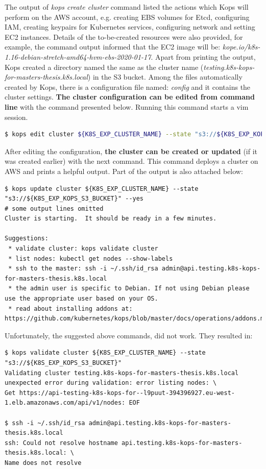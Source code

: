 The output of \textit{kops create cluster} command listed the actions which Kops will perform on the AWS account, e.g. creating EBS volumes for Etcd, configuring IAM, creating keypairs for Kubernetes services, configuring network and setting EC2 instances. Details of the to-be-created resources were also provided, for example, the command output informed that the EC2 image will be: \textit{kope.io/k8s-1.16-debian-stretch-amd64-hvm-ebs-2020-01-17}. Apart from printing the output, Kops created a directory named the same as the cluster name (\textit{testing.k8s-kops-for-masters-thesis.k8s.local}) in the S3 bucket. Among the files automatically created by Kops, there is a configuration file named: \textit{config} and it contains the cluster settings. \textbf{The cluster configuration can be edited from command line} with the command presented below. Running this command starts a vim session.
\begin{lstlisting}[basicstyle=\tiny,caption={Command used to edit a Kubernetes cluster managed by Kops},captionpos=b,language=Bash,xleftmargin=1cm]
$ kops edit cluster ${K8S_EXP_CLUSTER_NAME} --state "s3://${K8S_EXP_KOPS_S3_BUCKET}"
\end{lstlisting}
After editing the configuration, \textbf{the cluster can be created or updated} (if it was created earlier) with the next command. This command deploys a cluster on AWS and prints a helpful output. Part of the output is also attached below:
\begin{mdframed}[linecolor=white]
\begin{lstlisting}[basicstyle=\tiny,caption={Command used to deploy a Kubernetes cluster with Kops}]
$ kops update cluster ${K8S_EXP_CLUSTER_NAME} --state "s3://${K8S_EXP_KOPS_S3_BUCKET}" --yes
# some output lines omitted
Cluster is starting.  It should be ready in a few minutes.

Suggestions:
 * validate cluster: kops validate cluster
 * list nodes: kubectl get nodes --show-labels
 * ssh to the master: ssh -i ~/.ssh/id_rsa admin@api.testing.k8s-kops-for-masters-thesis.k8s.local
 * the admin user is specific to Debian. If not using Debian please use the appropriate user based on your OS.
 * read about installing addons at: https://github.com/kubernetes/kops/blob/master/docs/operations/addons.md.
\end{lstlisting}
\end{mdframed}

Unfortunately, the suggested above commands, did not work. They resulted in:
\begin{lstlisting}[basicstyle=\tiny,caption={Commands run to connect with a cluster created by Kops together with output}]
$ kops validate cluster ${K8S_EXP_CLUSTER_NAME} --state "s3://${K8S_EXP_KOPS_S3_BUCKET}"
Validating cluster testing.k8s-kops-for-masters-thesis.k8s.local
unexpected error during validation: error listing nodes: \
Get https://api-testing-k8s-kops-for--l9puut-394396927.eu-west-1.elb.amazonaws.com/api/v1/nodes: EOF

$ ssh -i ~/.ssh/id_rsa admin@api.testing.k8s-kops-for-masters-thesis.k8s.local
ssh: Could not resolve hostname api.testing.k8s-kops-for-masters-thesis.k8s.local: \
Name does not resolve
\end{lstlisting}

